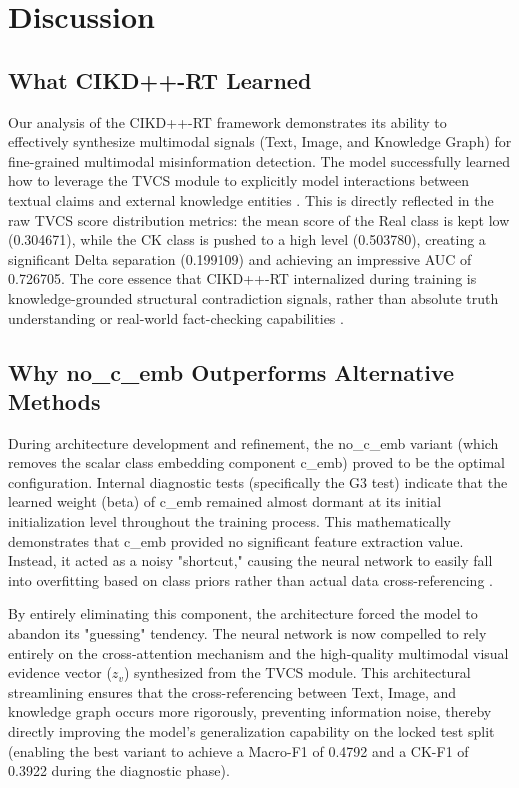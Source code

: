 ﻿\section{Discussion}

\subsection{What CIKD++-RT Learned}
Our analysis of the CIKD++-RT framework demonstrates its ability to effectively synthesize multimodal signals (Text, Image, and Knowledge Graph) for fine-grained multimodal misinformation detection. The model successfully learned how to leverage the TVCS module to explicitly model interactions between textual claims and external knowledge entities \cite{ref43}. This is directly reflected in the raw TVCS score distribution metrics: the mean score of the Real class is kept low (0.304671), while the CK class is pushed to a high level (0.503780), creating a significant Delta separation (0.199109) and achieving an impressive AUC of 0.726705. The core essence that CIKD++-RT internalized during training is knowledge-grounded structural contradiction signals, rather than absolute truth understanding or real-world fact-checking capabilities \cite{ref42}.

\subsection{Why no\_c\_emb Outperforms Alternative Methods}
During architecture development and refinement, the no\_c\_emb variant (which removes the scalar class embedding component c\_emb) proved to be the optimal configuration. Internal diagnostic tests (specifically the G3 test) indicate that the learned weight (beta) of c\_emb remained almost dormant at its initial initialization level throughout the training process. This mathematically demonstrates that c\_emb provided no significant feature extraction value. Instead, it acted as a noisy "shortcut," causing the neural network to easily fall into overfitting based on class priors rather than actual data cross-referencing \cite{ref44}.

By entirely eliminating this component, the architecture forced the model to abandon its "guessing" tendency. The neural network is now compelled to rely entirely on the cross-attention mechanism and the high-quality multimodal visual evidence vector ($z_v$) synthesized from the TVCS module. This architectural streamlining ensures that the cross-referencing between Text, Image, and knowledge graph occurs more rigorously, preventing information noise, thereby directly improving the model's generalization capability on the locked test split (enabling the best variant to achieve a Macro-F1 of 0.4792 and a CK-F1 of 0.3922 during the diagnostic phase).

